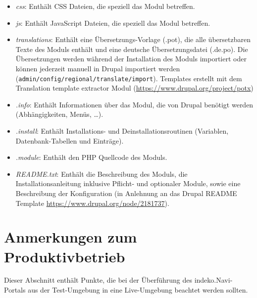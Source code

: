 \begin{itemize}
	\item \textit{css}: Enthält CSS Dateien, die speziell das Modul betreffen.

	\item \textit{js}: Enthält JavaScript Dateien, die speziell das Modul betreffen.

	\item \textit{translations}: Enthält eine Übersetzungs-Vorlage (.pot), die alle übersetzbaren Texte des Moduls enthält und eine deutsche Übersetzungsdatei (.de.po). Die Übersetzungen werden während der Installation des Moduls importiert oder können jederzeit manuell in Drupal importiert werden (\lstinline|admin/config/regional/translate/import|). Templates erstellt mit dem Translation template extractor Modul (\url{https://www.drupal.org/project/potx})

	\item \textit{.info}: Enthält Informationen über das Modul, die von Drupal benötigt werden (Abhängigkeiten, Menüs, \dots).

	\item \textit{.install}: Enthält Installations- und Deinstallationsroutinen (Variablen, Datenbank-Tabellen und Einträge).

	\item \textit{.module}: Enthält den PHP Quellcode des Moduls.

	\item \textit{README.txt}: Enthält die Beschreibung des Moduls, die Installationsanleitung inklusive Pflicht- und optionaler Module, sowie eine Beschreibung der Konfiguration (in Anlehnung an das Drupal README Template \url{https://www.drupal.org/node/2181737}).
\end{itemize}




\section{Anmerkungen zum Produktivbetrieb}\label{sec:live}
Dieser Abschnitt enthält Punkte, die bei der Überführung des \acrshort{indeko}.Navi-Portals aus der Test-Umgebung in eine Live-Umgebung beachtet werden sollten.

